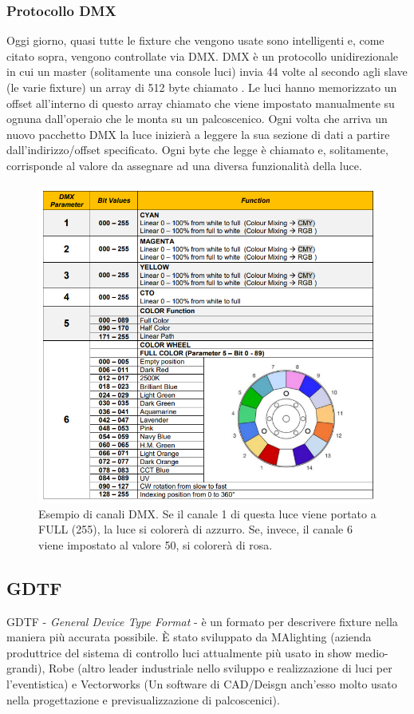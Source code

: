 \documentclass[main.tex]{subfiles}
\begin{document}
\subsubsection{Protocollo DMX}
Oggi giorno, quasi tutte le fixture che vengono usate sono intelligenti e, come citato sopra, vengono controllate via DMX. DMX è un protocollo unidirezionale in cui un master (solitamente una console luci) invia 44 volte al secondo agli slave (le varie fixture) un array di 512 byte chiamato . Le luci hanno memorizzato un offset all'interno di questo array chiamato  che viene impostato manualmente su ognuna dall'operaio che le monta su un palcoscenico. Ogni volta che arriva un nuovo pacchetto DMX la luce inizierà a leggere la sua sezione di dati a partire dall'indirizzo/offset specificato. Ogni byte che legge è chiamato  e, solitamente, corrisponde al valore da assegnare ad una diversa funzionalità della luce.
\begin{figure}[H]
    \centering
    \includegraphics[width=0.65\linewidth]{img/introduzione/dmxChannelDescExample.png}
    \caption{Esempio di canali DMX. Se il canale 1 di questa luce viene portato a FULL (255), la luce si colorerà di azzurro. Se, invece, il canale 6 viene impostato al valore 50, si colorerà di rosa.}
    \label{fig:dmxChannelsExample}
\end{figure}

\subsection{GDTF}\label{subsec:gdtf}
GDTF - \textit{General Device Type Format} - è un formato per descrivere fixture nella maniera più accurata possibile. È stato sviluppato da MAlighting (azienda produttrice del sistema di controllo luci attualmente più usato in show medio-grandi), Robe (altro leader industriale nello sviluppo e realizzazione di luci per l'eventistica) e Vectorworks (Un software di CAD/Deisgn anch'esso molto usato nella progettazione e previsualizzazione di palcoscenici). 
\newline
\end{document}
